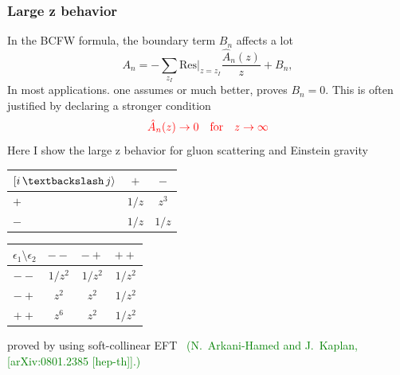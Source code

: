 \documentclass{beamer}
\begin{document}
\begin{frame}
    \frametitle{Large z behavior}
    In the BCFW formula, the boundary term $B_n$ affects a lot
    \begin{equation*}
        A_n=-\sum_{z_I}\mathrm{Res}|_{z=z_I}\frac{\hat{A}_n(z)}{z}+B_n,
    \end{equation*}
    In most applications. one assumes or much better, proves $B_n=0$. This is often justified by declaring a stronger condition
    \begin{equation*}
        \textcolor{red}{\hat{A}_n(z)\rightarrow 0 \quad \text{for} \quad z\rightarrow \infty} 
    \end{equation*}
    Here I show the large z behavior for gluon scattering and Einstein gravity 
    \begin{minipage}[t]{0.45\textwidth}
    \centering
    \begin{tabular}{lcc}
        \toprule
        $[i\, \textbackslash \, j\rangle $ & $+$ & $-$ \\
        \midrule
        $+$ & $1/z$ & $z^3$ \\
        $-$ & $1/z$ & $1/z$ \\
        \bottomrule
    \end{tabular}
\end{minipage}
\hfill
\begin{minipage}[t]{0.45\textwidth}
    \centering
    \begin{tabular}{cccc}
        \toprule
        $\epsilon_1 \setminus \epsilon_2$ & $--$ & $-+$ & $++$ \\
        \midrule
        $--$ & $1/z^2$ & $1/z^2$ & $1/z^2$ \\
        $-+$ & $z^2$   & $z^2$   & $1/z^2$ \\
        $++$ & $z^6$   & $z^2$   & $1/z^2$ \\
        \bottomrule
    \end{tabular}
\end{minipage}
\vspace{0.3em}

proved by using soft-collinear EFT ~\textcolor{green}{(N.~Arkani-Hamed and J.~Kaplan,
[arXiv:0801.2385 [hep-th]].)}
\end{frame}
\end{document}
